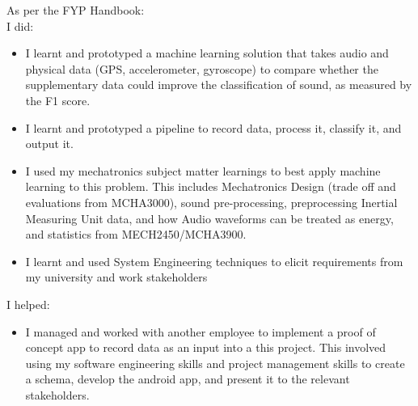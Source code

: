 \documentclass{UoNMCHA}
\numberwithin{equation}{section}
\begin{document}
As per the FYP Handbook: \\
I did:
\begin{itemize}
    \item I learnt and prototyped a machine learning solution that takes audio and physical data (GPS, accelerometer, gyroscope) to compare whether the supplementary data could improve the classification of sound, as measured by the F1 score.
    \item I learnt and prototyped a pipeline to record data, process it, classify it, and output it.
    \item I used my mechatronics subject matter learnings to best apply machine learning to this problem. This includes Mechatronics Design (trade off and evaluations from MCHA3000), sound pre-processing, preprocessing Inertial Measuring Unit data, and how Audio waveforms can be treated as energy, and statistics from MECH2450/MCHA3900.
    \item I learnt and used System Engineering techniques to elicit requirements from my university and work stakeholders
\end{itemize}
I helped:
\begin{itemize}
   \item I managed and worked with another employee to implement a proof of concept app to record data as an input into a this project. This involved using my software engineering skills and project management skills to create a schema, develop the android app, and present it to the relevant stakeholders.
\end{itemize}
\newpage

\vspace{-5mm}
\end{document}
